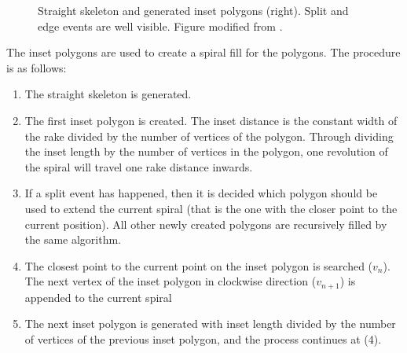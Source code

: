 \begin{figure}
\caption{Straight skeleton and generated inset polygons (right). Split and edge events are well visible. Figure modified from \cite{Aichholzer:jucs_1_12:a_novel_type_of}.}
\end{figure}


The inset polygons are used to create a spiral fill for the polygons. The procedure is as follows:

\begin{enumerate}
\item The straight skeleton is generated.
\item The first inset polygon is created. The inset distance is the constant width of the rake divided by the number of vertices of the polygon. Through dividing the inset length by the number of vertices in the polygon, one revolution of the spiral will travel one rake distance inwards.
\item If a split event has happened, then it is decided which polygon should be used to extend the current spiral (that is the one with the closer point to the current position). All other newly created polygons are recursively filled by the same algorithm. %
\item The closest point to the current point on the inset polygon is searched ($v_n$). The next vertex of the inset polygon in clockwise direction ($v_{n+1}$) is appended to the current spiral
\item The next inset polygon is generated with inset length divided by the number of vertices of the previous inset polygon, and the process continues at (4).

\end{enumerate}

